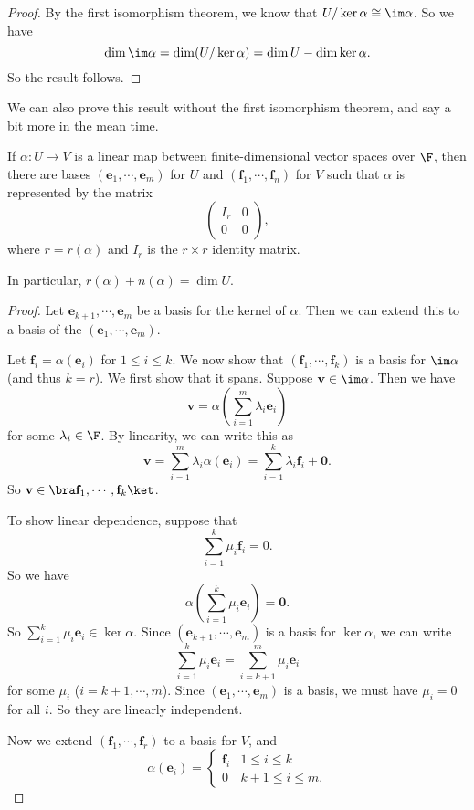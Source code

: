 \documentclass[a4paper]{article}
\begin{document}
\begin{proof}
  By the first isomorphism theorem, we know that $U/\ker \alpha \cong \im \alpha$. So we have
  \[
    \dim \im \alpha = \dim (U/\ker \alpha) = \dim U - \dim \ker \alpha.
  \]
  So the result follows.
\end{proof}

We can also prove this result without the first isomorphism theorem, and say a bit more in the mean time.
\begin{prop}
  If $\alpha: U\to V$ is a linear map between finite-dimensional vector spaces over $\F$, then there are bases $(\mathbf{e}_1, \cdots, \mathbf{e}_m)$ for $U$ and $(\mathbf{f}_1, \cdots, \mathbf{f}_n)$ for $V$ such that $\alpha$ is represented by the matrix
  \[
    \begin{pmatrix}
      I_r & 0\\
      0 & 0
    \end{pmatrix},
  \]
  where $r = r(\alpha)$ and $I_r$ is the $r\times r$ identity matrix.

  In particular, $r(\alpha) + n(\alpha) = \dim U$.
\end{prop}

\begin{proof}
  Let $\mathbf{e}_{k + 1}, \cdots, \mathbf{e}_m$ be a basis for the kernel of $\alpha$. Then we can extend this to a basis of the $(\mathbf{e}_1,\cdots, \mathbf{e}_m)$.

  Let $\mathbf{f}_i = \alpha(\mathbf{e}_i)$ for $1 \leq i \leq k$. We now show that $(\mathbf{f}_1, \cdots, \mathbf{f}_k)$ is a basis for $\im \alpha$ (and thus $k = r$). We first show that it spans. Suppose $\mathbf{v}\in \im \alpha$. Then we have
  \[
    \mathbf{v} = \alpha\left(\sum_{i = 1}^m \lambda_i \mathbf{e}_i\right)
  \]
  for some $\lambda_i \in \F$. By linearity, we can write this as
  \[
    \mathbf{v} = \sum_{i = 1}^m \lambda_i \alpha(\mathbf{e}_i) = \sum_{i = 1}^k \lambda_i \mathbf{f}_i + \mathbf{0}.
  \]
  So $\mathbf{v}\in \bra \mathbf{f}_1, \cdots, \mathbf{f}_k\ket$.

  To show linear dependence, suppose that
  \[
    \sum_{i = 1}^k \mu_i \mathbf{f}_i = 0.
  \]
  So we have
  \[
    \alpha \left(\sum_{i = 1}^k \mu_i \mathbf{e}_i\right) = \mathbf{0}.
  \]
  So $\sum_{i = 1}^k \mu_i \mathbf{e}_i \in \ker \alpha$. Since $(\mathbf{e}_{k + 1}, \cdots, \mathbf{e}_m)$ is a basis for $\ker \alpha$, we can write
  \[
    \sum_{i = 1}^k \mu_i \mathbf{e}_i = \sum_{i = k + 1}^m \mu_i \mathbf{e}_i
  \]
  for some $\mu_i$ ($i = k + 1, \cdots, m$). Since $(\mathbf{e}_1, \cdots, \mathbf{e}_m)$ is a basis, we must have $\mu_i = 0$ for all $i$. So they are linearly independent.

  Now we extend $(\mathbf{f}_1, \cdots, \mathbf{f}_r)$ to a basis for $V$, and
  \[
    \alpha(\mathbf{e}_i) =
    \begin{cases}
      \mathbf{f}_i & 1 \leq i \leq k\\
      0 & k + 1 \leq i \leq m.
    \end{cases}
  \]
\end{proof}
\end{document}

